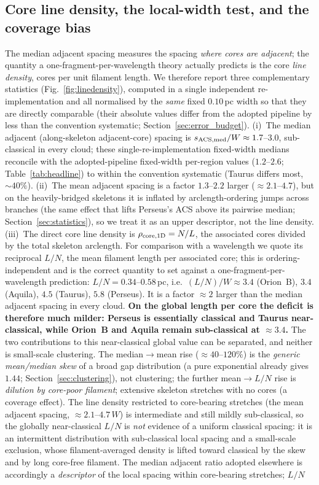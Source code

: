 \documentclass[usenatbib,twoside,twocolumn]{mnras}
\begin{document}
\subsection{Core line density, the local-width test, and the coverage bias}
\label{sec:linedensity}
The median adjacent spacing measures the spacing \emph{where cores are adjacent}; the quantity a one-fragment-per-wavelength theory actually predicts is the core \emph{line density}, cores per unit filament length. We therefore report three complementary statistics (Fig.~\ref{fig:linedensity}), computed in a single independent re-implementation and all normalised by the \emph{same} fixed $0.10$\,pc width so that they are directly comparable (their absolute values differ from the adopted pipeline by less than the convention systematic; Section~\ref{sec:error_budget}). (i)~The median adjacent (along-skeleton adjacent-core) spacing is $s_{\rm ACS,med}/W\approx1.7$--$3.0$, sub-classical in every cloud; these single-re-implementation fixed-width medians reconcile with the adopted-pipeline fixed-width per-region values ($1.2$--$2.6$; Table~\ref{tab:headline}) to within the convention systematic (Taurus differs most, $\sim40\%$). (ii)~The mean adjacent spacing is a factor $1.3$--$2.2$ larger ($\approx2.1$--$4.7$), but on the heavily-bridged skeletons it is inflated by arclength-ordering jumps across branches (the same effect that lifts Perseus's ACS above its pairwise median; Section~\ref{sec:statistics}), so we treat it as an upper descriptor, not the line density. (iii)~The direct core line density is $\rho_{\rm core,1D}=N/L$, the associated cores divided by the total skeleton arclength. For comparison with a wavelength we quote its reciprocal $L/N$, the mean filament length per associated core; this is ordering-independent and is the correct quantity to set against a one-fragment-per-wavelength prediction: $L/N=0.34$--$0.58$\,pc, i.e.\ $(L/N)/W\approx3.4$ (Orion~B), $3.4$ (Aquila), $4.5$ (Taurus), $5.8$ (Perseus). It is a factor $\approx2$ larger than the median adjacent spacing in every cloud. \textbf{On the global length per core the deficit is therefore much milder: Perseus is essentially classical and Taurus near-classical, while Orion~B and Aquila remain sub-classical at $\approx3.4$.} The two contributions to this near-classical global value can be separated, and neither is small-scale clustering. The median$\to$mean rise ($\approx40$--$120\%$) is the \emph{generic mean/median skew} of a broad gap distribution (a pure exponential already gives $1.44$; Section~\ref{sec:clustering}), not clustering; the further mean$\to L/N$ rise is \emph{dilution by core-poor filament}; extensive skeleton stretches with no cores (a coverage effect). The line density restricted to core-bearing stretches (the mean adjacent spacing, $\approx2.1$--$4.7\,W$) is intermediate and still mildly sub-classical, so the globally near-classical $L/N$ is \emph{not} evidence of a uniform classical spacing: it is an intermittent distribution with sub-classical local spacing and a small-scale exclusion, whose filament-averaged density is lifted toward classical by the skew and by long core-free filament. The median adjacent ratio adopted elsewhere is accordingly a \emph{descriptor} of the local spacing within core-bearing stretches; $L/N$ 
\end{document}
